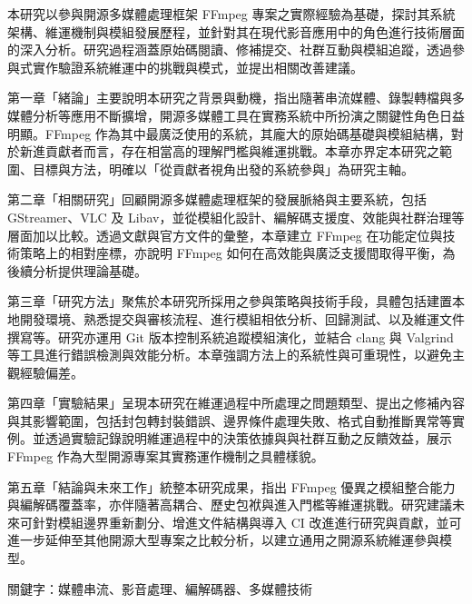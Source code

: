\newpage
{}
\normalsize


本研究以參與開源多媒體處理框架 FFmpeg 專案之實際經驗為基礎，探討其系統架構、維運機制與模組發展歷程，並針對其在現代影音應用中的角色進行技術層面的深入分析。研究過程涵蓋原始碼閱讀、修補提交、社群互動與模組追蹤，透過參與式實作驗證系統維運中的挑戰與模式，並提出相關改善建議。

第一章「緒論」主要說明本研究之背景與動機，指出隨著串流媒體、錄製轉檔與多媒體分析等應用不斷擴增，開源多媒體工具在實務系統中所扮演之關鍵性角色日益明顯。FFmpeg 作為其中最廣泛使用的系統，其龐大的原始碼基礎與模組結構，對於新進貢獻者而言，存在相當高的理解門檻與維運挑戰。本章亦界定本研究之範圍、目標與方法，明確以「從貢獻者視角出發的系統參與」為研究主軸。

第二章「相關研究」回顧開源多媒體處理框架的發展脈絡與主要系統，包括 GStreamer、VLC 及 Libav，並從模組化設計、編解碼支援度、效能與社群治理等層面加以比較。透過文獻與官方文件的彙整，本章建立 FFmpeg 在功能定位與技術策略上的相對座標，亦說明 FFmpeg 如何在高效能與廣泛支援間取得平衡，為後續分析提供理論基礎。

第三章「研究方法」聚焦於本研究所採用之參與策略與技術手段，具體包括建置本地開發環境、熟悉提交與審核流程、進行模組相依分析、回歸測試、以及維運文件撰寫等。研究亦運用 Git 版本控制系統追蹤模組演化，並結合 clang 與 Valgrind 等工具進行錯誤檢測與效能分析。本章強調方法上的系統性與可重現性，以避免主觀經驗偏差。

第四章「實驗結果」呈現本研究在維運過程中所處理之問題類型、提出之修補內容與其影響範圍，包括封包轉封裝錯誤、邊界條件處理失敗、格式自動推斷異常等實例。並透過實驗記錄說明維運過程中的決策依據與與社群互動之反饋效益，展示 FFmpeg 作為大型開源專案其實務運作機制之具體樣貌。

 第五章「結論與未來工作」統整本研究成果，指出 FFmpeg 優異之模組整合能力與編解碼覆蓋率，亦伴隨著高耦合、歷史包袱與進入門檻等維運挑戰。研究建議未來可針對模組邊界重新劃分、增進文件結構與導入 CI 改進進行研究與貢獻，並可進一步延伸至其他開源大型專案之比較分析，以建立通用之開源系統維運參與模型。

關鍵字：媒體串流、影音處理、編解碼器、多媒體技術